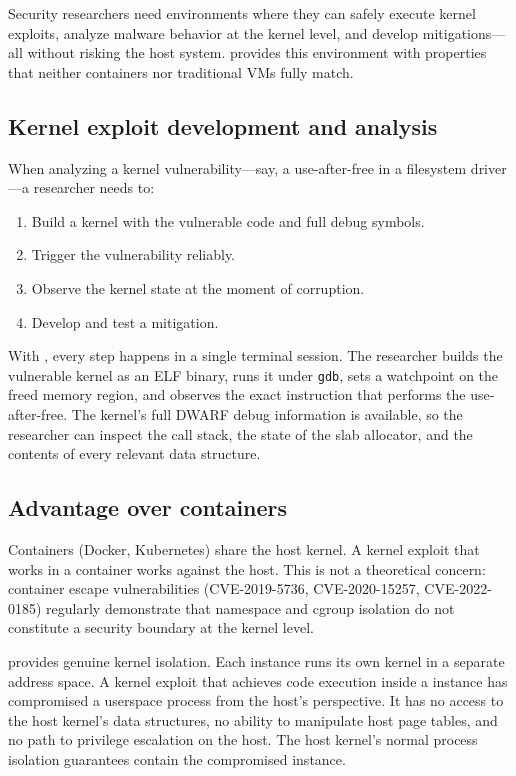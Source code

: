 Security researchers need environments where they can safely execute
kernel exploits, analyze malware behavior at the kernel level, and
develop mitigations---all without risking the host system.  \UML{}
provides this environment with properties that neither containers nor
traditional VMs fully match.

\subsection{Kernel exploit development and analysis}

When analyzing a kernel vulnerability---say, a use-after-free in a
filesystem driver---a researcher needs to:

\begin{enumerate}[leftmargin=2em]
  \item Build a kernel with the vulnerable code and full debug symbols.
  \item Trigger the vulnerability reliably.
  \item Observe the kernel state at the moment of corruption.
  \item Develop and test a mitigation.
\end{enumerate}

With \UML{}, every step happens in a single terminal session.  The
researcher builds the vulnerable kernel as an ELF binary, runs it
under \texttt{gdb}, sets a watchpoint on the freed memory region,
and observes the exact instruction that performs the use-after-free.
The kernel's full DWARF debug information is available, so the
researcher can inspect the call stack, the state of the slab
allocator, and the contents of every relevant data structure.

\subsection{Advantage over containers}

Containers (Docker, Kubernetes) share the host kernel.  A kernel
exploit that works in a container works against the host.  This is
not a theoretical concern: container escape vulnerabilities
(CVE-2019-5736, CVE-2020-15257, CVE-2022-0185) regularly demonstrate
that namespace and cgroup isolation do not constitute a security
boundary at the kernel level.

\UML{} provides genuine kernel isolation.  Each \UML{} instance
runs its own kernel in a separate address space.  A kernel exploit
that achieves code execution inside a \UML{} instance has compromised
a userspace process from the host's perspective.  It has no access
to the host kernel's data structures, no ability to manipulate host
page tables, and no path to privilege escalation on the host.  The
host kernel's normal process isolation guarantees contain the
compromised \UML{} instance.

